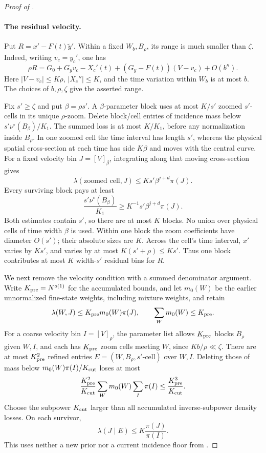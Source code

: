\begin{proof}[Proof of ]
\paragraph{The residual velocity.}
Put \(R=x'-F(t)\widetilde y'\).
Within a fixed \(W_b,B_\rho\), its range is much smaller than
\(\zeta\). Indeed, writing \(v_c=y_c'\), one has
\[
 \rho R
 =G_0+G_yv_c-X_c'(t)
       +(G_y-F(t))(V-v_c)+O(b^\kappa).
\]
Here \(|V-v_c|\leq K\rho\), \(|X_c''|\leq K\), and the time
variation within \(W_b\) is at most \(b\).
The choices of \(b,\rho,\zeta\) give the asserted range.

Fix \(s'\geq\zeta\) and put \(\beta=\rho s'\).
A \(\beta\)-parameter block uses at most \(K/s'\) zoomed
\(s'\)-cells in its unique \(\rho\)-zoom.
Delete block/cell entries of incidence mass below
\(s'\nu^\circ(B_\beta)/K_1\).
The summed loss is at most \(K/K_1\), before any normalization
inside \(B_\rho\).
In one zoomed cell the time interval has length \(s'\), whereas
the physical spatial cross-section at each time has side
\(K\beta\) and moves with the central curve.
For a fixed velocity bin \(J=[V]_\beta\), integrating
 along that moving cross-section gives
\[
 \lambda(\text{zoomed cell},J)
       \leq Ks'\beta^{j+d}\pi(J).
\]
Every surviving block pays at least
\[
 \frac{s'\nu^\circ(B_\beta)}{K_1}
       \geq K^{-1}s'\beta^{j+d}\pi(J).
\]
Both estimates contain \(s'\), so there are at most \(K\)
blocks. No union over physical cells of time width \(\beta\)
is used. Within one block the zoom coefficients have diameter
\(O(s')\); their absolute sizes are \(K\).
Across the cell's time interval, \(x'\) varies by \(Ks'\), and
 varies by at most \(K(s'+\rho)\leq Ks'\).
Thus one block contributes at most \(K\) width-\(s'\) residual
bins for \(R\).

We next remove the velocity condition with a summed denominator
argument. Write \(K_{\rm pre}=N^{o(1)}\) for the accumulated bounds, and let \(m_0(W)\) be the earlier unnormalized fine-state
weights, including mixture weights, and retain
\[
 \lambda(W,J)\leq K_{\rm pre}m_0(W)\pi(J),\qquad
 \sum_Wm_0(W)\leq K_{\rm pre}.
\]
For a coarse velocity bin \(I=[V]_\rho\), the parameter list
allows \(K_{\rm pre}\) blocks \(B_\rho\) given \(W,I\), and each has
\(K_{\rm pre}\) zoom cells meeting \(W\), since \(K b/\rho\ll\zeta\).
There are at most \(K_{\rm pre}^2\) refined entries
\(E=(W,B_\rho,s'\text{-cell})\) over \(W,I\).
Deleting those of mass below \(m_0(W)\pi(I)/K_{\rm cut}\) loses at most
\[
 \frac{K_{\rm pre}^2}{K_{\rm cut}}\sum_Wm_0(W)\sum_I\pi(I)
 \leq \frac{K_{\rm pre}^3}{K_{\rm cut}}.
\]
Choose the subpower \(K_{\rm cut}\) larger than all accumulated inverse-subpower
density losses. On each survivor,
\begin{equation}\label{a05:zoom-posterior}
 \lambda(J\mid E)\leq K\frac{\pi(J)}{\pi(I)}.
\end{equation}
This uses neither a new prior nor a current incidence floor from
.


\end{proof}
